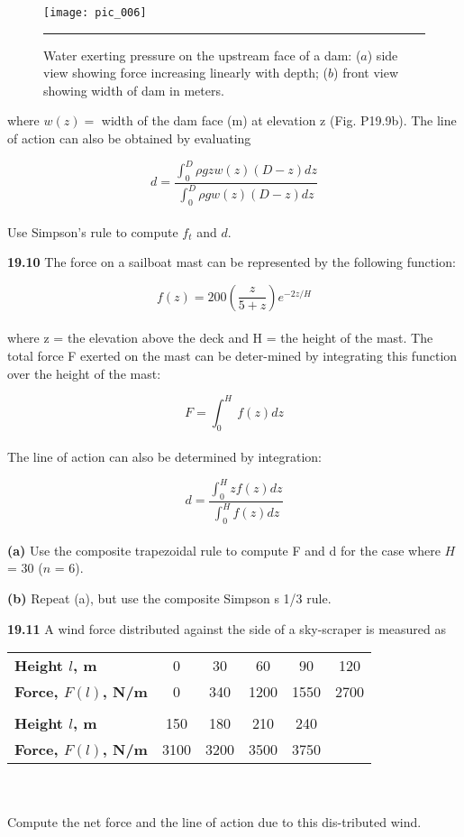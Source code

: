 \documentclass[../main.tex]{subfiles}
\begin{document}
\pagebreak
\begin{figure}[hbt!]
	\centering
	\texttt{[image: pic\_006]}
	\caption{\textsf{Water exerting pressure on the upstream face of a dam: ($a$) side view showing force increasing
linearly with depth; ($b$) front view showing width of dam in meters.}} \hrule
	\label{pic.006}
\end{figure}

\begin{multicols}{2}
where $w(z) =$ width of the dam face (m) at elevation z
(Fig. P19.9b). The line of action can also be obtained by
evaluating

	$$d=\dfrac{\int^{D}_{0}\rho gzw(z)(D-z)dz}{\int^{D}_{0}\rho gw(z)(D-z)dz}$$\\
Use Simpson's rule to compute $f_t$ and $d$.

\textbf{19.10} The force on a sailboat mast can be represented by the
following function:

	$$f(z)=200\left(\dfrac{z}{5+z}\right)e^{-2z/H}$$\\
where z = the elevation above the deck and H = the height of
the mast. The total force F exerted on the mast can be deter-mined by integrating this function over the height of the mast:

	$$F=\int^{H}_{0}\:f(z)dz$$\\
The line of action can also be determined by integration:

	$$d=\dfrac{\int^{H}_{0} zf(z)dz}{\int^{H}_{0} f(z)dz}$$\\
	
\textbf{(a)} Use the composite trapezoidal rule to compute F and d
for the case where $H$ = 30 ($n$ = 6).

\textbf{(b)} Repeat (a), but use the composite Simpson s 1/3 rule.

\textbf{19.11} A wind force distributed against the side of a sky-scraper is measured as\\
\begin{tabular}{lccccc}
	\hline
\scriptsize{\textbf{Height $l$, m}} & \scriptsize{0} & \scriptsize{30} & \scriptsize{60} & \scriptsize{90} & \scriptsize{120}\\
\scriptsize{\textbf{Force, $F(l)$, N/m}} & \scriptsize{0} & \scriptsize{340} & \scriptsize{1200} & \scriptsize{1550} & \scriptsize{2700}\\
\vspace{0in}\\
\scriptsize{\textbf{Height $l$, m}} & \scriptsize{150} & \scriptsize{180} & \scriptsize{210} & \scriptsize{240} & \vspace{0in} \\
\scriptsize{\textbf{Force, $F(l)$, N/m}} & \scriptsize{3100} & \scriptsize{3200} & \scriptsize{3500} & \scriptsize{3750} & \vspace{0in} \\ \hline
\end{tabular}\\
\vspace{0.1pt}\\
Compute the net force and the line of action due to this dis-tributed wind.



\end{multicols}
\end{document}
